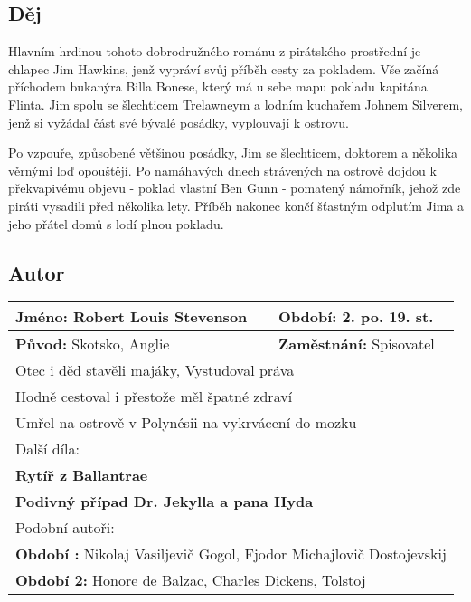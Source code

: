 \subsection*{Děj}
Hlavním hrdinou tohoto dobrodružného románu z pirátského prostřední je chlapec Jim Hawkins, jenž vypráví svůj příběh cesty za pokladem.
Vše začíná příchodem bukanýra Billa Bonese, který má u sebe mapu pokladu kapitána Flinta.
Jim spolu se šlechticem Trelawneym a lodním kuchařem Johnem Silverem, jenž si vyžádal část své bývalé posádky, vyplouvají k ostrovu.

Po vzpouře, způsobené většinou posádky, Jim se šlechticem, doktorem a několika věrnými loď opouštějí.
Po namáhavých dnech strávených na ostrově dojdou k překvapivému objevu - poklad vlastní Ben Gunn - pomatený námořník, jehož zde piráti vysadili před několika lety.
Příběh nakonec končí šťastným odplutím Jima a jeho přátel domů s lodí plnou pokladu.
\subsection*{Autor}
\begin{tabularx}{\linewidth}{l|l}
  \textbf{Jméno:} Robert Louis Stevenson & \textbf{Období:} 2. po. 19. st.                        \\
  \hline
  \textbf{Původ:} Skotsko, Anglie        & \textbf{Zaměstnání:} Spisovatel                        \\
  \hline
  \multicolumn{2}{l}{Otec i děd stavěli majáky, Vystudoval práva}                                 \\
  \multicolumn{2}{l}{Hodně cestoval i přestože měl špatné zdraví}                                 \\
  \multicolumn{2}{l}{Umřel na ostrově v Polynésii na vykrvácení do mozku}                         \\
  \hline
  \multicolumn{2}{l}{Další díla:}                                                                 \\
  \multicolumn{2}{l}{\textbf{Rytíř z Ballantrae}}                                                 \\
  \multicolumn{2}{l}{\textbf{Podivný případ Dr. Jekylla a pana Hyda}}                             \\
  \hline
  \multicolumn{2}{l}{Podobní autoři:}                                                             \\
  \multicolumn{2}{l}{\textbf{Období :} Nikolaj Vasiljevič Gogol, Fjodor Michajlovič Dostojevskij} \\
  \multicolumn{2}{l}{\textbf{Období 2:} Honore de Balzac, Charles Dickens, Tolstoj}               \\
\end{tabularx}
